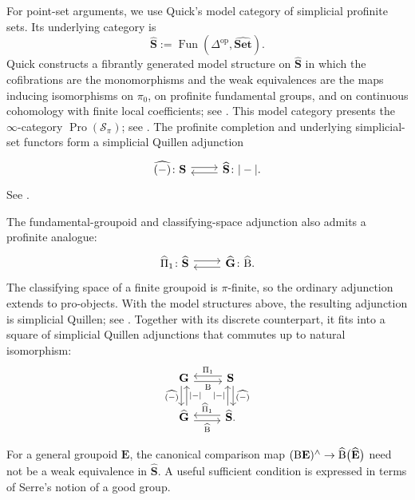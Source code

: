 \documentclass{amsart}
\newcommand{\bE}{\mathbf{E}}
\newcommand{\sSet}{\mathbf{S}}
\newcommand{\Grpd}{\mathbf{G}}
\newcommand{\Pro}{\operatorname{Pro}}
\newcommand{\cs}{\textnormal{B}}
\theoremstyle{definition}
\numberwithin{equation}{section}
\begin{document}
For point-set arguments, we use Quick's model category of simplicial
profinite sets. Its underlying category is
\[
\widehat{\sSet}
:=
\operatorname{Fun}
(\Delta^{\mathrm{op}},\widehat{\mathbf{Set}}).
\]
Quick constructs a fibrantly generated model structure on
$\widehat{\sSet}$ in which the cofibrations are the monomorphisms and
the weak equivalences are the maps inducing isomorphisms on $\pi_0$,
on profinite fundamental groups, and on continuous cohomology with
finite local coefficients; see \cite[Theorem~2.12]{Quick}. This model
category presents the $\infty$-category $\Pro(\mathcal S_\pi)$; see
\cite[Theorem~1.1(4) and Corollary~6.6]{BM20}. The profinite
completion and underlying simplicial-set functors form a simplicial
Quillen adjunction
\begin{equation}
\label{eq: profinite completion of spaces}
\begin{tikzcd}
\widehat{(-)}\colon\sSet
  \arrow[r, shift left=1]
&
  \arrow[l, shift left=1]
\widehat{\sSet}\colon|-|.
\end{tikzcd}
\end{equation}
See \cite[Proposition~2.28]{Quick}.

The fundamental-groupoid and classifying-space adjunction also admits
a profinite analogue:
\[
\begin{tikzcd}
\widehat{\Pi}_1\colon\widehat{\sSet}
  \arrow[r, shift left=1.2]
&
  \arrow[l, shift left=1.2]
\widehat{\Grpd}\colon\widehat{\cs}.
\end{tikzcd}
\]
The classifying space of a finite groupoid is $\pi$-finite, so the
ordinary adjunction extends to pro-objects. With the model structures
above, the resulting adjunction is simplicial Quillen; see
\cite[Example~7.14]{BM20}. Together with its discrete counterpart, it
fits into a square of simplicial Quillen adjunctions that commutes up
to natural isomorphism:
\[
\begin{tikzcd}
\Grpd
  \arrow[d, shift right=1, "\widehat{(-)}"']
  \arrow[r, shift right=1, "\cs"']
&
\sSet
  \arrow[l, shift right=1, "\Pi_1"']
  \arrow[d, shift left=1, "\widehat{(-)}"]
\\
\widehat{\Grpd}
  \arrow[u, shift right=1, "|-|"']
  \arrow[r, shift right=1, "\widehat{\cs}"']
&
\widehat{\sSet}
  \arrow[l, shift right=1, "\widehat{\Pi}_1"']
  \arrow[u, shift left=1, "|-|"].
\end{tikzcd}
\]

For a general groupoid $\bE$, the canonical comparison map
$(\cs\bE)^{\wedge}\to
\widehat{\cs}\bigl(\widehat{\bE}\bigr)$ need not be a weak
equivalence in $\widehat{\sSet}$. A useful sufficient condition is
expressed in terms of Serre's notion of a good group.
\end{document}
